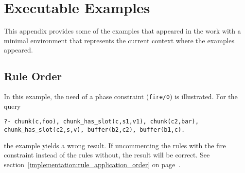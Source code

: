 \chapter{Executable Examples}

This appendix provides some of the examples that appeared in the work with a minimal environment that represents the current context where the examples appeared.

\section{Rule Order}
\label{app:ex:rule_order}

In this example, the need of a phase constraint (\lstinline|fire/0|) is illustrated. For the query

\begin{lstlisting}
?- chunk(c,foo), chunk_has_slot(c,s1,v1), chunk(c2,bar), chunk_has_slot(c2,s,v), buffer(b2,c2), buffer(b1,c).
\end{lstlisting}

the example yields a wrong result. If uncommenting the rules with the fire constraint instead of the rules without, the result will be correct. See section~\ref{implementation:rule_application_order} on page~\pageref{implementation:rule_application_order}.


